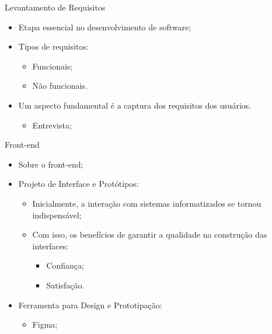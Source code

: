 \begin{frame}{Levantamento de Requisitos}
    \begin{itemize}
        \item Etapa essencial no desenvolvimento de software; \vspace{0.5cm}
        \item Tipos de requisitos: \vspace{0.5cm}
              \begin{itemize}
                  \item Funcionais; \vspace{0.25cm}
                  \item Não funcionais. \vspace{0.5cm}
              \end{itemize}
        \item Um aspecto fundamental é a captura dos requisitos dos usuários. \vspace{0.25cm}
              \begin{itemize}
                  \item Entrevista; \vspace{0.25cm}
              \end{itemize}
    \end{itemize}
\end{frame}

\begin{frame}{Front-end}
    \begin{itemize}
        \item Sobre o front-end; \vspace{0.5cm}
        \item Projeto de Interface e Protótipos: \vspace{0.5cm}
              \begin{itemize}
                  \item Inicialmente, a interação com sistemas informatizados se tornou indispensável; \vspace{0.25cm}
                  \item Com isso, os benefícios de garantir a qualidade na construção das interfaces: \vspace{0.25cm}
                        \begin{itemize}
                            \item Confiança; \vspace{0.25cm}
                            \item Satisfação. \vspace{0.25cm}
                        \end{itemize}
              \end{itemize}
        \item Ferramenta para Design e Prototipação: \vspace{0.5cm}
              \begin{itemize}
                  \item Figma; \vspace{0.25cm}
              \end{itemize}
    \end{itemize}
\end{frame}

